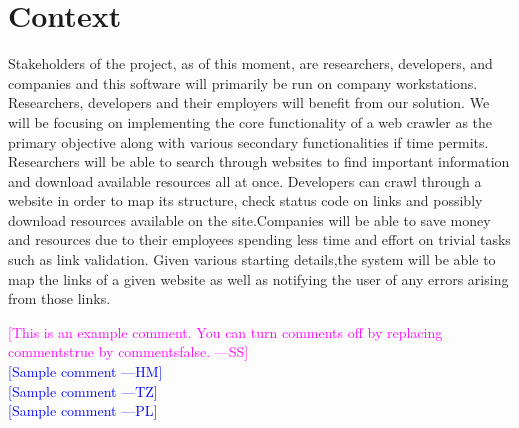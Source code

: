 \documentclass[12pt]{article}
\newcommand{\authornote}[3]{\textcolor{#1}{[#3 ---#2]}}
\newcommand{\authornote}[3]{}
\newcommand{\wss}[1]{\authornote{magenta}{SS}{#1}}
\newcommand{\hm}[1]{\authornote{blue}{HM}{#1}} %
\newcommand{\tz}[1]{\authornote{blue}{TZ}{#1}} %
\newcommand{\pl}[1]{\authornote{blue}{PL}{#1}} %
\begin{document}
\section{Context}

Stakeholders of the project, as of this moment, are researchers, developers, and companies and this software will primarily be run on company workstations.\\

Researchers, developers and their employers will benefit from our solution. We will be focusing on implementing the core functionality of a web crawler as the primary objective along with various secondary functionalities if time permits. Researchers will be able to search through websites to find important information and download available resources all at once. Developers can crawl through a website in order to map its structure, check status code on links and possibly download resources available on the site.Companies will be able to save money and resources due to their employees spending less time and effort on trivial tasks such as link validation. Given various starting details,the system will be able to map the links of a given website as well as notifying the user of any errors arising from those links.\newline



\noindent \wss{This is an example comment.  You can turn comments off by replacing
  commentstrue by commentsfalse.}\\
\hm{Sample comment}\\
\tz{Sample comment}\\
\pl{Sample comment}
\end{document}
